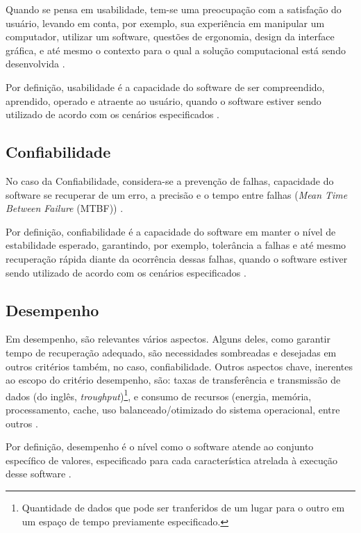 Quando se pensa em usabilidade, tem-se uma preocupação com a satisfação do usuário, levando em conta, por exemplo, sua experiência em manipular um computador, utilizar um software, questões de ergonomia, design da interface gráfica, e até mesmo o contexto para o qual a solução computacional está sendo desenvolvida \cite{cintra2006implementaccao}.

Por definição, usabilidade é a capacidade do software de ser compreendido, aprendido, operado e atraente ao usuário, quando o software estiver sendo utilizado de acordo com os cenários especificados \cite{qualidadeDeProdutoNBR}.


\subsection{Confiabilidade}
\label{subsec:confiabilidade}

No caso da Confiabilidade, considera-se a prevenção de falhas, capacidade do software se recuperar de um erro, a precisão e o tempo entre falhas (\textit{Mean Time Between Failure} (MTBF)) \cite{cintra2006implementaccao}.

Por definição, confiabilidade é a capacidade do software em manter o nível de estabilidade esperado, garantindo, por exemplo, tolerância a falhas e até mesmo recuperação rápida diante da ocorrência dessas falhas, quando o software estiver sendo utilizado de acordo com os cenários especificados \cite{qualidadeDeProdutoNBR}.  

\subsection{Desempenho}
\label{subsec:desempenho}

Em desempenho, são relevantes vários aspectos. Alguns deles, como garantir tempo de recuperação adequado, são necessidades sombreadas e desejadas em outros critérios também, no caso, confiabilidade. Outros aspectos chave, inerentes ao escopo do critério desempenho, são: taxas de transferência e transmissão de dados (do inglês, \textit{troughput})\footnote[1]{Quantidade de dados que pode ser tranferidos de um lugar para o outro em um espaço de tempo previamente especificado.}, e consumo de recursos (energia, memória, processamento, cache, uso balanceado/otimizado do sistema operacional, entre outros \cite{cintra2006implementaccao}.

Por definição, desempenho é o nível como o software atende ao conjunto específico de valores, especificado para cada característica atrelada à execução desse software \cite{qualidadeDeProdutoNBR}.  


